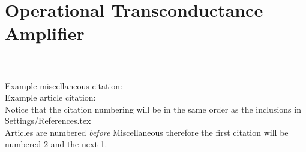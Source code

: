 \documentclass[../main.tex]{subfiles}
\begin{document}
\section{Operational Transconductance Amplifier}

\blindtext\\

\blindtext\\

\noindent Example miscellaneous citation: \cite{Author}\\

\noindent Example article citation: \cite{einstein}\\

\noindent Notice that the citation numbering will be in the same
order as the inclusions in Settings/References.tex\\

\noindent Articles are numbered \emph{before} Miscellaneous therefore the
first citation will be numbered 2 and the next 1.
\end{document}
